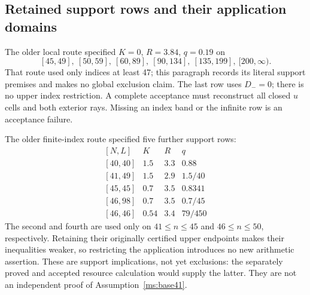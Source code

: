 \subsection{Retained support rows and their application domains}
\label{ms:legacy-support:rows}
The older local route specified $K=0$, $R=3.84$, $q=0.19$ on
\[
[45,49],\ [50,59],\ [60,89],\ [90,134],\ [135,199],\ [200,\infty).
\]
That route used only indices at least 47; this paragraph records its
literal support premises and makes no global exclusion claim. The last row uses $D_-=0$;
there is no upper index restriction. A complete acceptance must reconstruct all closed $u$ cells and both exterior rays. Missing an index band
or the infinite row is an acceptance failure.

The older finite-index route specified five further support rows:
\[
\begin{array}{c|c|c|c}
[N,L]&K&R&q\\\hline
{[40,40]}&1.5&3.3&0.88\\
{[41,49]}&1.5&2.9&1.5/40\\
{[45,45]}&0.7&3.5&0.8341\\
{[46,98]}&0.7&3.5&0.7/45\\
{[46,46]}&0.54&3.4&79/450
\end{array}
\]
The second and fourth are used only on $41\le n\le45$ and
$46\le n\le50$, respectively. Retaining their originally certified
upper endpoints makes their inequalities weaker, so restricting the
application introduces no new arithmetic assertion. These are support
implications, not yet exclusions: the separately proved and accepted
resource calculation would supply the latter. They are not an independent
proof of Assumption~\ref{ms:base41}.

